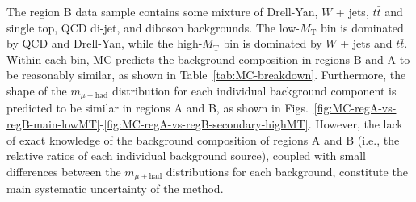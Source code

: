 The region B data sample contains some mixture of Drell-Yan, $W$ + jets, $t\bar{t}$ and single top, QCD di-jet, and diboson backgrounds.  The low-$M_{\text{T}}$ bin is dominated by QCD and Drell-Yan, while the high-$M_{\text{T}}$ bin is dominated by $W$ + jets and $t\bar{t}$.  Within each bin, MC predicts the background composition in regions B and A to be reasonably similar, as shown in Table~\ref{tab:MC-breakdown}.  Furthermore, the shape of the $m_{\mu+\text{had}}$ distribution for each individual background component is predicted to be similar in regions A and B, as shown in Figs.~\ref{fig:MC-regA-vs-regB-main-lowMT}-\ref{fig:MC-regA-vs-regB-secondary-highMT}.  However, the lack of exact knowledge of the background composition of regions A and B (i.e., the relative ratios of each individual background source), coupled with small differences between the $m_{\mu+\text{had}}$ distributions for each background, constitute the main systematic uncertainty of the method.


